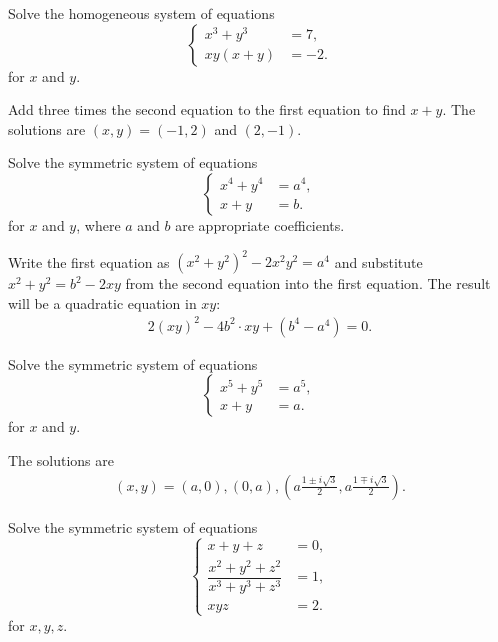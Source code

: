 \begin{question}\label{p:sys-eq-C}
    Solve the homogeneous system of equations $$\begin{cases}
        x^3+y^3 &=7,\\ xy(x+y) &= -2.
    \end{cases}$$ for $x$ and $y$.
\end{question}


\begin{solution}
    Add three times the second equation to the first equation to find $x+y$. The solutions are $(x,y)=(-1,2)$ and $(2,-1)$.
\end{solution}


\begin{question}\label{p:sys-eq-D}
    Solve the symmetric system of equations $$\begin{cases}
        x^4+y^4 &= a^4,\\ x+y &= b.
    \end{cases}$$ for $x$ and $y$, where $a$ and $b$ are appropriate coefficients. 
\end{question}


\begin{solution}
    Write the first equation as $(x^2+y^2)^2-2x^2y^2=a^4$ and substitute $x^2+y^2=b^2-2xy$ from the second equation into the first equation. The result will be a quadratic equation in $xy$:
        \begin{align*}
            2(xy)^2 - 4b^2\cdot xy + (b^4-a^4)=0.
        \end{align*}
\end{solution}


\begin{question}\label{p:sys-eq-E}
    Solve the symmetric system of equations $$\begin{cases}
         x^5+y^5 &= a^5,\\ x+y &= a.
    \end{cases}$$ for $x$ and $y$.
\end{question}


\begin{solution}
    The solutions are
        \begin{align*}
            (x,y) = (a,0), (0,a), \left(a\frac{1\pm i\sqrt{3}}{2},a\frac{1\mp i\sqrt{3}}{2}\right).
        \end{align*}
\end{solution}



\begin{question}\label{p:sys-eq-F}
    Solve the symmetric system of equations $$\begin{cases}
        x+y+z &= 0,\\ \dfrac{x^2+y^2+z^2}{x^3+y^3+z^3} &=1,\\xyz &=2.
    \end{cases}$$ for $x,y,z$.
\end{question}


